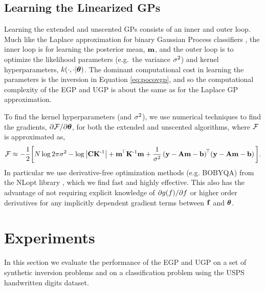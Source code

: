 \documentclass{article} %
\begin{document}
\subsection{Learning the Linearized GPs}

Learning the extended and unscented GPs consists of  an inner and outer loop.
Much like the Laplace approximation for binary Gaussian Process classifiers
\cite{Rasmussen2006}, the inner loop is for learning the posterior mean,
$\mathbf{m}$, and the outer loop is to optimize the likelihood parameters
(e.g.~the variance $\sigma^2$) and kernel hyperparameters,
$k\!\left({{\cdot}, {\cdot|\boldsymbol\theta}}\right)$. The dominant computational cost in learning
the parameters is the inversion in Equation \eqref{eq:pocovgp}, and so the
computational complexity of the EGP and UGP is about the same as for the
Laplace GP approximation.

To find the kernel hyperparameters (and $\sigma^2$), we use numerical techniques
to find the gradients, $\partial\mathcal{F}/\partial\boldsymbol\theta$, for both the extended
and unscented algorithms, where $\mathcal{F}$ is approximated as,
\begin{equation}
    \mathcal{F} \approx - \frac{1}{2} \bigg[
    N\log{2\pi\ensuremath{\sigma^2}} - \log\left|{\mathbf{C}\mathbf{K}^{\text{-}1}}\right|
    + \mathbf{m}^{\!\top}\mathbf{K}^{\text{-}1} \mathbf{m}
    + \frac{1}{\sigma^2}
        \left({\mathbf{y} - \mathbf{A}\mathbf{m} - \mathbf{b}}\right)^{\!\top}\!
        \left({\mathbf{y} - \mathbf{A}\mathbf{m} - \mathbf{b}}\right)
    \bigg].
    \label{eq:fengygp}
\end{equation}
In particular we use derivative-free optimization methods (e.g. BOBYQA)
from the NLopt library \cite{JohnsonNLOPT}, which we find fast and highly
effective. This also has the advantage of not requiring explicit knowledge of
$\partial g\!\left({{f}}\right)\!/\partial f$ or higher order derivatives for
any implicitly dependent gradient terms between $\mathbf{f}$ and $\boldsymbol\theta$. 


\section{Experiments}
%
In this section we evaluate the performance of the EGP and UGP on a 
set of synthetic inversion problems and on a classification problem 
using the USPS handwritten digits dataset.

\label{sec:experiments}

\end{document}
